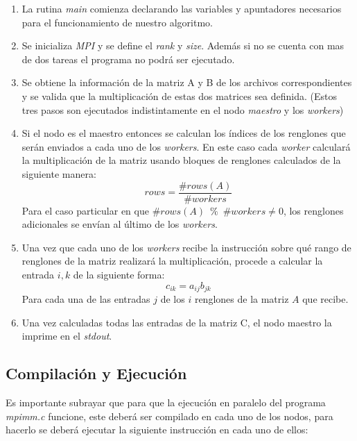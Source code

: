 \documentclass[DIV=calc, paper=letter, fontsize=11pt, twocolumn]{scrartcl}
\begin{document}
\begin{enumerate}
    \item La rutina \textit{main} comienza declarando las variables y apuntadores necesarios para el funcionamiento de nuestro algoritmo.
    \item Se inicializa \textit{MPI} y se define el \textit{rank} y \textit{size}. Además si no se cuenta con mas de dos tareas el programa no podrá ser ejecutado.
    \item Se obtiene la información de la matriz A y B de los archivos correspondientes y se valida que la multiplicación de estas dos matrices sea definida. (Estos tres pasos son ejecutados indistintamente en el nodo \textit{maestro} y los \textit{workers})
    \item Si el nodo es el maestro entonces se calculan los índices de los renglones que serán enviados a cada uno de los \textit{workers}. En este caso cada \textit{worker} calculará la multiplicación de la matriz usando bloques de renglones calculados de la siguiente manera:
    \begin{equation}
        rows = \frac{\#rows(A)}{\#workers}
    \end{equation}
    Para el caso particular en que $\# rows(A) \phantom{1} \% \phantom{1} \# workers \neq 0$, los renglones adicionales se envían al último de los \textit{workers}.
    \item Una vez que cada uno de los \textit{workers} recibe la instrucción sobre qué rango de renglones de la matriz realizará la multiplicación, procede a calcular la entrada $i,k$ de la siguiente forma:
    \begin{equation}
        c_{ik}=a_{ij}b_{jk}
    \end{equation}
    Para cada una de las entradas $j$ de los $i$ renglones de la matriz $A$ que recibe.
    \item Una vez calculadas todas las entradas de la matriz C, el nodo maestro la imprime en el \textit{stdout}.
\end{enumerate}

\subsection{Compilación y Ejecución}

Es importante subrayar que para que la ejecución en paralelo del programa \textit{mpimm.c} funcione, este deberá ser compilado en cada uno de los nodos, para hacerlo se deberá ejecutar la siguiente instrucción en cada uno de ellos:
\end{document}
